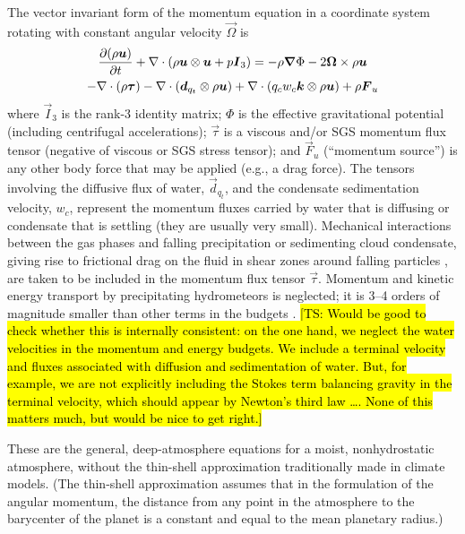 \documentclass{report}
\begin{document}
The vector invariant form of the momentum equation in a coordinate system rotating with constant angular velocity $\vec{\Omega}$ is 
\begin{multline}
\frac{\partial (\rho\boldsymbol{{u}})}{\partial t} + \nabla \cdot \left( \rho\boldsymbol{{u}} \otimes \boldsymbol{{u}} + p \boldsymbol{{I}}_3\right) =
- \rho \boldsymbol{{\nabla}}\Phi - 2\boldsymbol{{\Omega}} \times \rho\boldsymbol{{u}} \\
- \nabla \cdot (\rho \boldsymbol{{\tau}}) - \nabla \cdot\left( \boldsymbol{{d}}_{q_t} \otimes \rho\boldsymbol{{u}} \right) + \nabla \cdot \left( q_c w_c \boldsymbol{{k}} \otimes \rho \boldsymbol{{u}} \right) + \rho \boldsymbol{{F}}_u
\label{eq:governing_equations/momentum}
\end{multline}
where $\vec{I}_3$ is the rank-3 identity matrix; $\Phi$ is the effective gravitational potential (including centrifugal accelerations); $\vec{\tau}$ is a viscous and/or SGS momentum flux tensor (negative of viscous or SGS stress tensor); and $\vec{F}_u$ (``momentum source'') is any other body force that may be applied (e.g., a drag force). The tensors involving the diffusive flux of water, $\vec{d}_{q_t}$, and the condensate sedimentation velocity,  $w_c$, represent the momentum fluxes carried by water that is diffusing or condensate that is settling (they are usually very small). Mechanical interactions between the gas phases and falling precipitation or sedimenting cloud condensate, giving rise to frictional drag on the fluid in shear zones around falling particles \citep{Pauluis00}, are taken to be included in the momentum flux tensor $\vec{\tau}$. Momentum and kinetic energy transport by precipitating hydrometeors is neglected; it is 3--4 orders of magnitude smaller than other terms in the budgets \citep{Romps08a}. \hl{[TS: Would be good to check whether this is internally consistent: on the one hand, we neglect the water velocities in the  momentum and energy budgets. We include a terminal velocity and fluxes associated with diffusion and sedimentation of water. But, for example, we are not explicitly including the Stokes term balancing gravity in the terminal velocity, which should appear by Newton's third law \dots. None of this matters much, but would be nice to get right.]} 

These are the general, deep-atmosphere equations for a moist, nonhydrostatic atmosphere, without the thin-shell approximation traditionally made in climate models. (The thin-shell approximation assumes that in the formulation of the angular momentum, the distance from any point in the atmosphere to the barycenter of the planet is a constant and equal to the mean planetary radius.)
\end{document}
